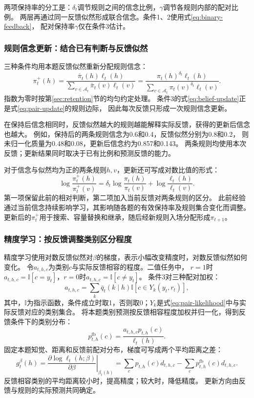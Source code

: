 \documentclass[11pt,a4paper]{article}
\numberwithin{equation}{section}
\newcommand{\ind}{\mathbb{I}}
\newcommand{\A}{\mathcal{A}}
\begin{document}
两项保持率的分工是：$\delta_t$调节规则之间的信念比例，$\gamma$调节各规则内部的配对比例。
两层再通过同一反馈似然形成联合信念。条件1、2使用式\eqref{eq:binary-feedback}，
配对保持率$\gamma$仅在条件3估计。

\subsubsection{规则信念更新：结合已有判断与反馈似然}
\label{sec:belief-update}
三种条件均用本题反馈似然重新分配规则信念：
\begin{equation}
\pi_t^+(h)=\frac{\bar\pi_t(h)\ell_t(h)}
{\sum_{v\in\A_t}\bar\pi_t(v)\ell_t(v)}
=\frac{\pi_t(h)^{\delta_t}\ell_t(h)}
{\sum_{v\in\A_t}\pi_t(v)^{\delta_t}\ell_t(v)}.
\label{eq:belief-update}
\end{equation}
指数为零时按第\ref{sec:retention}节的均匀约定处理。
条件3的式\eqref{eq:belief-update}正是式\eqref{eq:pair-update}的规则边际，
因此每次反馈只形成一次规则信念更新。

在保持后信念相同时，反馈似然越大的规则越能解释实际反馈，获得的更新后信念也越大。
例如，保持后的两条规则信念为0.6和0.4，反馈似然分别为0.8和0.2，
则未归一化质量为0.48和0.08，更新后信念约为0.857和0.143。
两条规则均使用本次反馈；更新结果同时取决于已有比例和预测反馈的能力。

对于信念与似然均为正的两条规则$h,v$，更新还可写成对数比值的形式：
\begin{equation}
\log\frac{\pi_t^+(h)}{\pi_t^+(v)}
=\delta_t\log\frac{\pi_t(h)}{\pi_t(v)}
+\log\frac{\ell_t(h)}{\ell_t(v)}.
\label{eq:belief-odds}
\end{equation}
第一项保留此前的相对判断，第二项加入当前反馈对两条规则的区分。
此前经验通过当前信念持续影响学习，其影响随各题的有效保持率及规则集合变化而调整。
更新后的$\pi_t^+$用于搜索、容量替换和继承，随后经新规则入场分配形成$\pi_{t+1}$。

\subsubsection{精度学习：按反馈调整类别区分程度}
\label{sec:precision}
精度学习使用对数反馈似然对$\beta$的梯度，表示小幅改变精度时，对数反馈似然如何变化。
令$a_{t,h,c}$为类别$c$与实际反馈相容的程度。二值任务中，
$r=1$时$a_{t,h,c}=\ind[c=y_t]$，$r=0$时$a_{t,h,c}=\ind[c\ne y_t]$。
条件3对三种配对加权：
\begin{equation}
a_{t,h,c}=\sum_k\bar q_t(k\mid h)\ind[c\in Y_k(y_t,r_t)],
\end{equation}
其中，$\ind$为指示函数，条件成立时取1，否则取0；$Y_k$是式\eqref{eq:pair-likelihood}中与实际反馈对应的类别集合。
将本题类别预测按反馈相容程度加权并归一化，得到反馈条件下的类别分布：
\begin{equation}
p_{t,h}^{\mathrm{fb}}(c)=\frac{a_{t,h,c}p_{t,h}(c)}{\ell_t(h)}.
\end{equation}
固定本题知觉、距离和反馈前配对分布，梯度可写成两个平均距离之差：
\begin{equation}
g_t^\beta(h)=\left.\frac{\partial\log\ell_t(h;\beta)}{\partial\beta}\right|_{\beta_t(h)}
=\sum_c p_{t,h}(c)d_{t,h,c}-\sum_c p_{t,h}^{\mathrm{fb}}(c)d_{t,h,c}.
\label{eq:gradient}
\end{equation}
反馈相容类别的平均距离较小时，提高精度；较大时，降低精度。
更新方向由反馈与规则的实际预测共同确定。
\end{document}
